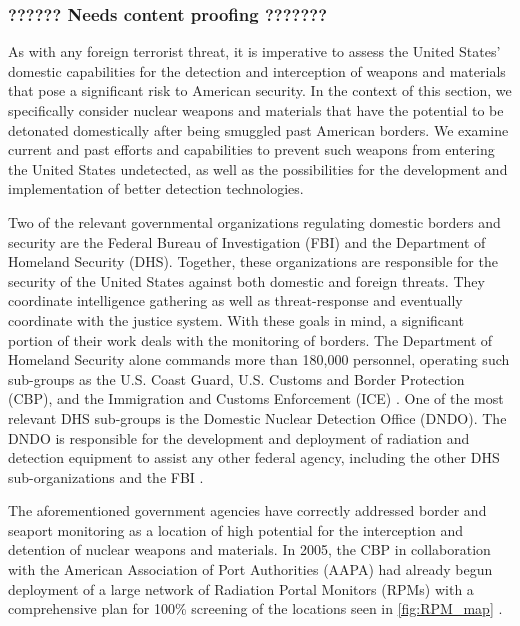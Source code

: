 \documentclass{report}
\begin{document}
\subsubsection{??????  Needs content proofing ???????}


As with any foreign terrorist threat, it is imperative to assess the United States' domestic capabilities for the detection and interception of weapons and materials that pose a significant risk to American security. In the context of this section, we specifically consider nuclear weapons and materials that have the potential to be detonated domestically after being smuggled past American borders. We examine current and past efforts and capabilities to prevent such weapons from entering the United States undetected, as well as the possibilities for the development and implementation of better detection technologies. 

Two of the relevant governmental organizations regulating domestic borders and security are the Federal Bureau of Investigation (FBI) and the Department of Homeland Security (DHS). Together, these organizations are responsible for the security of the United States against both domestic and foreign threats. They coordinate intelligence gathering as well as threat-response and eventually coordinate with the justice system. With these goals in mind, a significant portion of their work deals with the monitoring of borders. The Department of Homeland Security alone commands more than 180,000 personnel, operating such sub-groups as the U.S. Coast Guard, U.S. Customs and Border Protection (CBP), and the Immigration and Customs Enforcement (ICE) \cite{Robb2005}. One of the most relevant DHS sub-groups is the Domestic Nuclear Detection Office (DNDO). The DNDO is responsible for the development and deployment of radiation and detection equipment to assist any other federal agency, including the other DHS sub-organizations and the FBI \cite{UnitedStatesGovernmentAccountabilityOffice2013}. 

The aforementioned government agencies have correctly addressed border and seaport monitoring as a location of high potential for the interception and detention of nuclear weapons and materials. In 2005, the CBP in collaboration with the American Association of Port Authorities (AAPA) had already begun deployment of a large network of Radiation Portal Monitors (RPMs) with a comprehensive plan for 100\% screening of the locations seen in \autoref{fig:RPM_map} \cite{Simmons2005}. 
\end{document}
